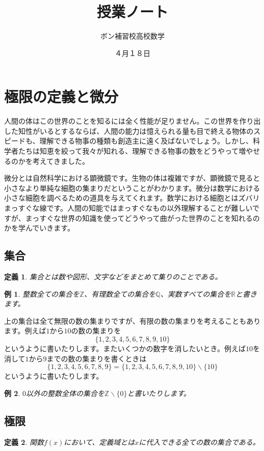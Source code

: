 \documentclass{ltjsarticle}
\title{授業ノート}
\author{ボン補習校高校数学}
\date{４月１８日}
\newtheorem{definition}{定義}[section]
\newtheorem{example}{例}[section]
\newcommand*{\Z}{\mathbb{Z}}
\newcommand*{\Q}{\mathbb{Q}}
\newcommand*{\R}{\mathbb{R}}
\begin{document}
\maketitle

\section{極限の定義と微分}
人間の体はこの世界のことを知るには全く性能が足りません。この世界を作り出した知性がいるとするならば、人間の能力は憶えられる量も目で終える物体のスピードも、理解できる物事の種類も創造主に遠く及ばないでしょう。しかし、科学者たちは知恵を絞って我々が知れる、理解できる物事の数をどうやって増やせるのかを考えてきました。
\par 微分とは自然科学における顕微鏡です。生物の体は複雑ですが、顕微鏡で見ると小さなより単純な細胞の集まりだということがわかります。微分は数学における小さな細胞を調べるための道具を与えてくれます。数学における細胞とはズバリまっすぐな線です。人間の知能ではまっすぐなもの以外理解することが難しいですが、まっすぐな世界の知識を使ってどうやって曲がった世界のことを知れるのかを学んでいきます。
\subsection{集合}

\begin{definition}
集合とは数や図形、文字などをまとめて集りのことである。
\end{definition}

\begin{example}
整数全ての集合を$\Z$、有理数全ての集合を$\Q$、実数すべての集合を$\R$と書きます。
\end{example}

上の集合は全て無限の数の集まりですが、有限の数の集まりを考えることもあります。例えば$1$から$10$の数の集まりを
\begin{equation*}
\{1,2,3,4,5,6,7,8,9,10\}
\end{equation*}
というように書いたりします。またいくつかの数字を消したいとき。例えば$10$を消して$1$から$9$までの数の集まりを書くときは
\begin{equation*}
\{1,2,3,4,5,6,7,8,9\}=\{1,2,3,4,5,6,7,8,9,10\}\backslash\{10\}
\end{equation*}
というように書いたりします。
\begin{example}
$0$以外の整数全体の集合を$\Z\backslash\{0\}$と書いたりします。
\end{example}
\subsection{極限}
\begin{definition}
関数$f(x)$において、定義域とは$x$に代入できる全ての数の集合である。
\end{definition}
\end{document}

